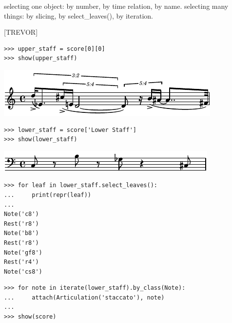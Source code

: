 \documentclass{article}
\begin{document}
selecting one object: by number, by time relation, by name.
selecting many things: by slicing, by select\_leaves(), by iteration.

[TREVOR]



\begin{lstlisting}
>>> upper_staff = score[0][0]
>>> show(upper_staff)
\end{lstlisting}

\noindent\includegraphics[scale=1.0]{images/abjad-7.pdf}


\begin{lstlisting}
>>> lower_staff = score['Lower Staff']
>>> show(lower_staff)
\end{lstlisting}

\noindent\includegraphics[scale=1.0]{images/abjad-8.pdf}


\begin{lstlisting}
>>> for leaf in lower_staff.select_leaves():
...     print(repr(leaf))
... 
Note('c8')
Rest('r8')
Note('b8')
Rest('r8')
Note('gf8')
Rest('r4')
Note('cs8')
\end{lstlisting}


\begin{lstlisting}
>>> for note in iterate(lower_staff).by_class(Note):
...     attach(Articulation('staccato'), note)
... 
>>> show(score)
\end{lstlisting}
\end{document}

